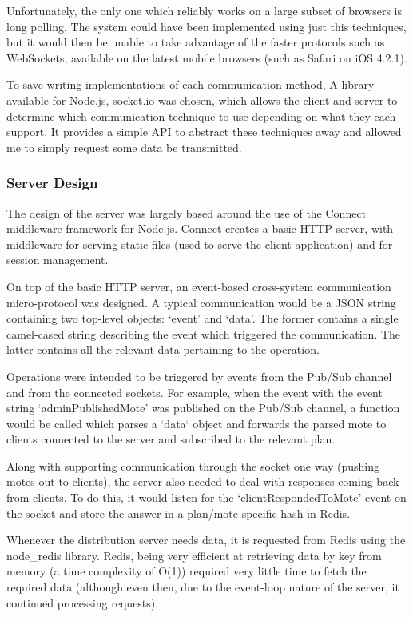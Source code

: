 \documentclass[a4papert,11pt,notitlepage]{ltxdoc}
\begin{document}
Unfortunately, the only one which reliably works on a large subset of browsers is long polling. The system could have been implemented using just this techniques, but it would then be unable to take advantage of the faster protocols such as WebSockets, available on the latest mobile browsers (such as Safari on iOS 4.2.1).

To save writing implementations of each communication method, A library available for Node.js, socket.io\cite{socketio:web} was chosen, which allows the client and server to determine which communication technique to use depending on what they each support. It provides a simple API to abstract these techniques away and allowed me to simply request some data be transmitted. 

\subsubsection{Server Design}
The design of the server was largely based around the use of the Connect middleware framework for Node.js. Connect creates a basic HTTP server, with middleware for serving static files (used to serve the client application) and for session management.

On top of the basic HTTP server, an event-based cross-system communication micro-protocol was designed. A typical communication would be a JSON string containing two top-level objects: `event' and `data'. The former contains a single camel-cased string describing the event which triggered the communication. The latter contains all the relevant data pertaining to the operation.

Operations were intended to be triggered by events from the Pub/Sub channel and from the connected sockets. For example, when the event  with the event string `adminPublishedMote' was published on the Pub/Sub channel, a function would be called which parses a `data` object and forwards the parsed mote to clients connected to the server and subscribed to the relevant plan.

Along with supporting communication through the socket one way (pushing motes out to clients), the server also needed to deal with responses coming back from clients. To do this, it would listen for the `clientRespondedToMote' event on the socket and store the answer in a plan/mote specific hash in Redis.

Whenever the distribution server needs data, it is requested from Redis using the node\_redis\cite{noderedis:web} library. Redis, being very efficient at retrieving data by key from memory (a time complexity of O(1)) required very little time to fetch the required data (although even then, due to the event-loop nature of the server, it continued processing requests).
\end{document}
